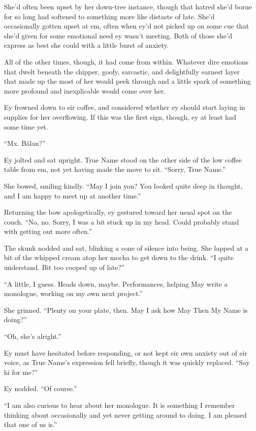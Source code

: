 She'd often been upset by her down-tree instance, though that hatred she'd borne for so long had softened to something more like distaste of late. She'd occasionally gotten upset at em, often when ey'd not picked up on some cue that she'd given for some emotional need ey wasn't meeting. Both of those she'd express as best she could with a little burst of anxiety.

All of the other times, though, it had come from within. Whatever dire emotions that dwelt beneath the chipper, goofy, sarcastic, and delightfully earnest layer that made up the most of her would peek through and a little spark of something more profound and inexplicable would come over her.

Ey frowned down to eir coffee, and considered whether ey should start laying in supplies for her overflowing. If this was the first sign, though, ey at least had some time yet.

``Mx. Bălan?''

Ey jolted and sat upright. True Name stood on the other side of the low coffee table from em, not yet having made the move to sit. ``Sorry, True Name.''

She bowed, smiling kindly. ``May I join you? You looked quite deep in thought, and I am happy to meet up at another time.''

Returning the bow apologetically, ey gestured toward her usual spot on the couch. ``No, no. Sorry, I was a bit stuck up in my head. Could probably stand with getting out more often.''

The skunk nodded and sat, blinking a cone of silence into being. She lapped at a bit of the whipped cream atop her mocha to get down to the drink. ``I quite understand. Bit too cooped up of late?''

``A little, I guess. Heads down, maybe. Performances, helping May write a monologue, working on my own next project.''

She grinned. ``Plenty on your plate, then. May I ask how May Then My Name is doing?''

``Oh, she's alright.''

Ey must have hesitated before responding, or not kept eir own anxiety out of eir voice, as True Name's expression fell briefly, though it was quickly replaced. ``Say hi for me?''

Ey nodded. ``Of course.''

``I am also curious to hear about her monologue. It is something I remember thinking about occasionally and yet never getting around to doing. I am pleased that one of us is.''

